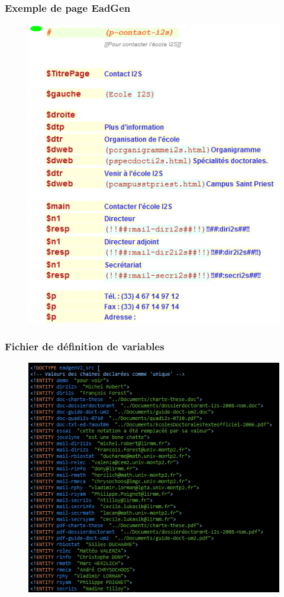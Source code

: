 
\begin{frame}
	\frametitle{Exemple de page EadGen}
	\begin{figure}
		\centering
		\includegraphics[scale=0.5]{resources/CaptureTemplateBeau.PNG}
	\end{figure}
	\end{frame}
\begin{frame}
	\frametitle{Fichier de définition de variables}
	\begin{figure}
		\centering
		\includegraphics[scale=0.58]{resources/variables.PNG}
	\end{figure}
	\end{frame}
